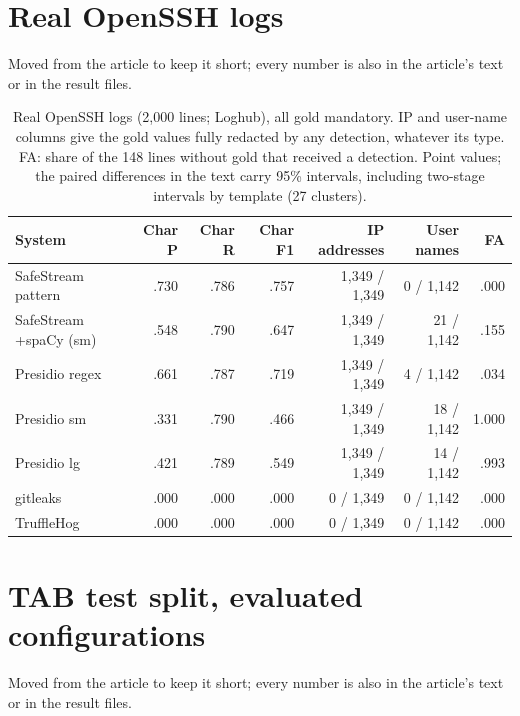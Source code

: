 \documentclass[11pt,a4paper]{article}
\begin{document}
\section{Real OpenSSH logs}

Moved from the article to keep it short; every number is also in the article's text or in the result files.

\begin{table}[ht]
\caption{Real OpenSSH logs (2,000 lines; Loghub), all gold mandatory. IP and user-name columns give the gold values fully redacted by any detection, whatever its type. FA: share of the 148 lines without gold that received a detection. Point values; the paired differences in the text carry 95\% intervals, including two-stage intervals by template (27 clusters).}\label{t:ssh}
\footnotesize
\setlength{\tabcolsep}{3pt}
\begin{tabular*}{\textwidth}{@{\extracolsep\fill}lrrrrrr}
\toprule
System & Char P & Char R & Char F1 & IP addresses & User names & FA \\
\midrule
SafeStream pattern & .730 & .786 & .757 & 1,349 / 1,349 & 0 / 1,142 & .000 \\
SafeStream +spaCy (sm) & .548 & .790 & .647 & 1,349 / 1,349 & 21 / 1,142 & .155 \\
Presidio regex & .661 & .787 & .719 & 1,349 / 1,349 & 4 / 1,142 & .034 \\
Presidio sm & .331 & .790 & .466 & 1,349 / 1,349 & 18 / 1,142 & 1.000 \\
Presidio lg & .421 & .789 & .549 & 1,349 / 1,349 & 14 / 1,142 & .993 \\
gitleaks & .000 & .000 & .000 & 0 / 1,349 & 0 / 1,142 & .000 \\
TruffleHog & .000 & .000 & .000 & 0 / 1,349 & 0 / 1,142 & .000 \\
\bottomrule
\end{tabular*}
\end{table}

\section{TAB test split, evaluated configurations}

Moved from the article to keep it short; every number is also in the article's text or in the result files.
\end{document}
